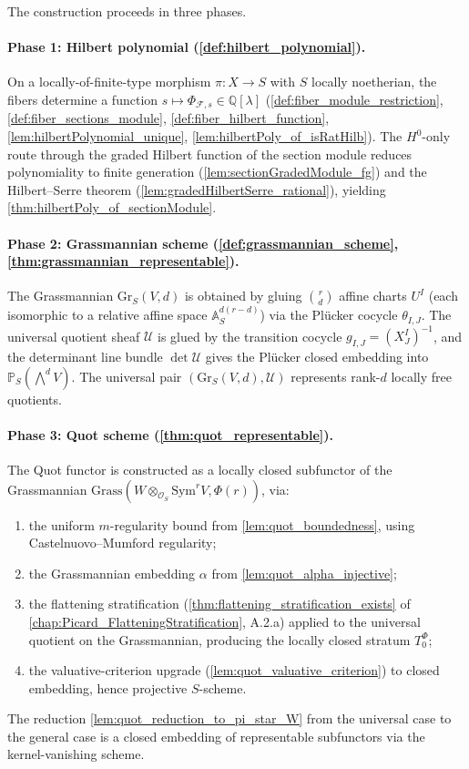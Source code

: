 The construction proceeds in three phases.

\paragraph{Phase 1: Hilbert polynomial (\cref{def:hilbert_polynomial}).}
On a locally-of-finite-type morphism \(\pi : X \to S\) with \(S\) locally
noetherian, the fibers determine a function
\(s \mapsto \Phi_{\mathcal{F},s} \in \mathbb{Q}[\lambda]\)
(\cref{def:fiber_module_restriction}, \cref{def:fiber_sections_module},
\cref{def:fiber_hilbert_function}, \cref{lem:hilbertPolynomial_unique},
\cref{lem:hilbertPoly_of_isRatHilb}). The \(H^0\)-only route through the
  graded Hilbert function of the section module reduces polynomiality to
  finite generation (\cref{lem:sectionGradedModule_fg}) and the
  Hilbert--Serre theorem (\cref{lem:gradedHilbertSerre_rational}), yielding
  \cref{thm:hilbertPoly_of_sectionModule}.

\paragraph{Phase 2: Grassmannian scheme (\cref{def:grassmannian_scheme},
\cref{thm:grassmannian_representable}).} The Grassmannian
\(\mathrm{Gr}_S(V, d)\) is obtained by gluing \(\binom{r}{d}\)
affine charts \(U^I\) (each isomorphic to a relative affine space
\(\mathbb{A}^{d(r-d)}_S\)) via the Pl\"ucker cocycle \(\theta_{I,J}\). The
universal quotient sheaf \(\mathcal{U}\) is glued by the transition cocycle
  \(g_{I,J} = (X^I_J)^{-1}\), and the determinant line bundle
  \(\det \mathcal{U}\) gives the Pl\"ucker closed embedding into
  \(\mathbb{P}_S(\bigwedge^d V)\). The universal pair
  \((\mathrm{Gr}_S(V, d), \mathcal{U})\) represents rank-\(d\) locally
  free quotients.

\paragraph{Phase 3: Quot scheme (\cref{thm:quot_representable}).}
The Quot functor is constructed as a locally closed subfunctor of the
Grassmannian
\(\mathrm{Grass}(W \otimes_{\mathcal{O}_S} \mathrm{Sym}^r V, \Phi(r))\), via:
\begin{enumerate}
  \item the uniform \(m\)-regularity bound from
    \cref{lem:quot_boundedness}, using Castelnuovo--Mumford regularity;
  \item the Grassmannian embedding \(\alpha\) from
    \cref{lem:quot_alpha_injective};
  \item the flattening stratification (\cref{thm:flattening_stratification_exists}
    of \cref{chap:Picard_FlatteningStratification}, A.2.a) applied to the
    universal quotient on the Grassmannian, producing the locally closed
    stratum \(T_0^\Phi\);
  \item the valuative-criterion upgrade
    (\cref{lem:quot_valuative_criterion}) to closed embedding, hence
    projective \(S\)-scheme.
\end{enumerate}
The reduction \cref{lem:quot_reduction_to_pi_star_W} from the universal
case to the general case is a closed embedding of representable
subfunctors via the kernel-vanishing scheme.

